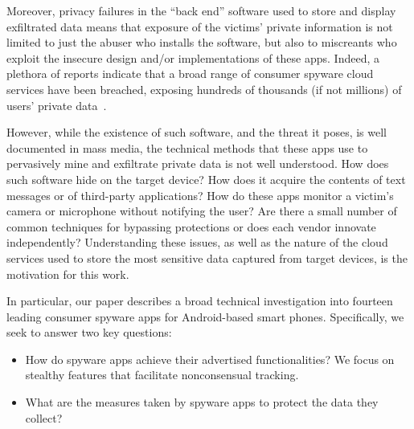 \documentclass[sigconf,balance=false]{acmart}
\begin{document}
Moreover, privacy failures in the ``back end'' software used to store and
display exfiltrated data means that exposure of the victims' private information is not limited to just the abuser who installs the software, but also to miscreants who exploit the insecure design and/or implementations of these apps.
Indeed, a plethora of reports indicate that a broad range of consumer spyware cloud services have been breached,
exposing hundreds of thousands (if not millions) of users' private data~\cite{HackerSt66:online,Companyt8:online,mSpybrea38:online,mSpyCybe86:online,Cerberus12:online,Stalkerw59:online,HackerSt50:online,Spywaref13:online,RetinaXa98:online,Hackercl62:online}.

However, while the existence of such software, and the threat it poses,
is well documented in mass media, the technical methods that these apps use to pervasively mine and exfiltrate private data is not well understood.
How does such software hide on
the target device?  How does it acquire the contents of text messages
or of third-party applications? How do these apps monitor a victim's camera or microphone without notifying the user?  Are there a small number of
common techniques for bypassing protections or does each vendor
innovate independently?  Understanding these issues, as well as the
nature of the cloud services used to store the most sensitive data
captured from target devices, is the motivation for this work.

In particular, our paper describes a broad technical investigation
into fourteen leading consumer spyware apps for Android-based smart
phones.
Specifically, we seek to answer two key questions:
\begin{itemize}
    \item How do spyware apps achieve their advertised functionalities? We focus on stealthy features that facilitate nonconsensual tracking.
    \item What are the measures taken by spyware apps to protect the data they collect?
\end{itemize}
\end{document}

